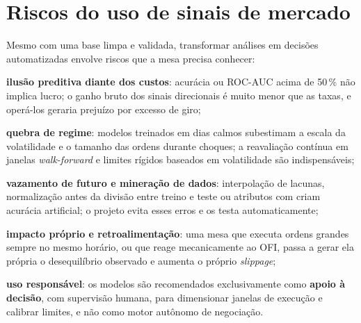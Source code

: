 \section{Riscos do uso de sinais de mercado}\label{sec:riscos}

Mesmo com uma base limpa e validada, transformar análises em decisões
automatizadas envolve riscos que a mesa precisa conhecer:

\begin{alineas}
  \item \textbf{ilusão preditiva diante dos custos}: acurácia ou ROC-AUC acima de
        50\,\% não implica lucro; o ganho bruto dos sinais direcionais é muito menor
        que as taxas, e operá-los geraria prejuízo por excesso de giro;
  \item \textbf{quebra de regime}: modelos treinados em dias calmos subestimam a
        escala da volatilidade e o tamanho das ordens durante choques; a
        reavaliação contínua em janelas \textit{walk-forward} e limites rígidos
        baseados em volatilidade são indispensáveis;
  \item \textbf{vazamento de futuro e mineração de dados}: interpolação de lacunas,
        normalização antes da divisão entre treino e teste ou atributos com
         criam acurácia artificial; o projeto evita esses erros e os
        testa automaticamente;
  \item \textbf{impacto próprio e retroalimentação}: uma mesa que executa ordens
        grandes sempre no mesmo horário, ou que reage mecanicamente ao OFI, passa
        a gerar ela própria o desequilíbrio observado e aumenta o próprio
        \textit{slippage};
  \item \textbf{uso responsável}: os modelos são recomendados exclusivamente como
        \textbf{apoio à decisão}, com supervisão humana, para dimensionar janelas
        de execução e calibrar limites, e não como motor autônomo de
        negociação.
\end{alineas}
